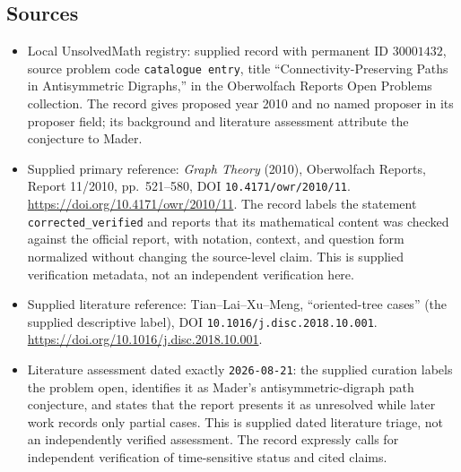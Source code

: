 \documentclass[11pt]{article}
\begin{document}
\subsection{Sources}
\begin{itemize}
\item Local UnsolvedMath registry: supplied record with permanent ID \(30001432\), source problem code \texttt{catalogue entry}, title ``Connectivity-Preserving Paths in Antisymmetric Digraphs,'' in the Oberwolfach Reports Open Problems collection. The record gives proposed year 2010 and no named proposer in its proposer field; its background and literature assessment attribute the conjecture to Mader.
\item Supplied primary reference: \emph{Graph Theory} (2010), Oberwolfach Reports, Report 11/2010, pp.\ 521--580, DOI \texttt{10.4171/owr/2010/11}. \url{https://doi.org/10.4171/owr/2010/11}. The record labels the statement \texttt{corrected\_verified} and reports that its mathematical content was checked against the official report, with notation, context, and question form normalized without changing the source-level claim. This is supplied verification metadata, not an independent verification here.
\item Supplied literature reference: Tian--Lai--Xu--Meng, ``oriented-tree cases'' (the supplied descriptive label), DOI \texttt{10.1016/j.disc.2018.10.001}. \url{https://doi.org/10.1016/j.disc.2018.10.001}.
\item Literature assessment dated exactly \texttt{2026-08-21}: the supplied curation labels the problem open, identifies it as Mader's antisymmetric-digraph path conjecture, and states that the report presents it as unresolved while later work records only partial cases. This is supplied dated literature triage, not an independently verified assessment. The record expressly calls for independent verification of time-sensitive status and cited claims.
\end{itemize}
\end{document}
